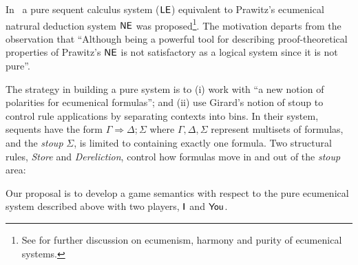 
In~\cite{DBLP:journals/logcom/MarinPPS25} a pure sequent calculus system ($\mathsf{LE}$) equivalent to Prawitz's ecumenical natrural deduction system $\mathsf{NE}$ was proposed\footnote{See \cite{DBLP:conf/dali/MarinPPS20,DBLP:journals/synthese/PimentelPP21,DBLP:conf/wollic/MarinPPS21,DBLP:conf/calco/PimentelP23,Pereira2024} for further discussion on ecumenism, harmony and purity of ecumenical systems.}. The motivation departs from the observation that ``Although being a powerful tool for describing proof-theoretical properties of Prawitz's $\mathsf{NE}$ is not satisfactory as a logical system since it is not pure''. 

The strategy in building a pure system is to (i) work with ``a new notion of polarities for ecumenical formulas''; 
and (ii) use Girard's notion of stoup \cite{DBLP:journals/mscs/Girard91} to control rule applications by separating contexts into bins. In their system, sequents have the form $\Gamma \Rightarrow \Delta;\Sigma$ where $\Gamma, \Delta, \Sigma$ represent multisets of formulas, and the \textit{stoup} $\Sigma$, is limited to containing exactly one formula. Two structural rules, \textit{Store} and \textit{Dereliction}, control how formulas move in and out of the \textit{stoup} area:

    \begin{center}
    \begin{minipage}[b]{.3 \textwidth}
        \begin{prooftree}
        \end{prooftree}
    \end{minipage}
    \begin{minipage}[b]{.3 \textwidth}
        \begin{prooftree}
        \end{prooftree}
    \end{minipage}
    \end{center}

Our proposal is to develop a game semantics with respect to the pure ecumenical system described above with two players, $\mathsf{I}$  and $\mathsf{You}$.

